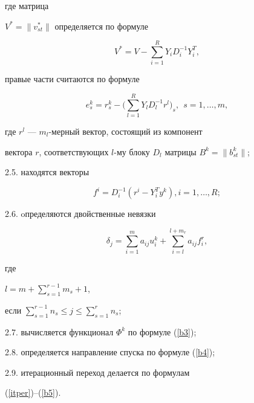 где матрица


$V^* = \|v_{st}^*\|$ определяется по формуле


\begin{equation}\label{b7}


V^* = V - \sum\limits_{i=1}^RY_iD_i^{-1}Y_i^T,


\end{equation}


правые части считаются по формуле


$$


e_s^k = r_s^k - \bigg(\sum\limits_{l=1}^RY_lD_l^{-1}r^l\bigg)_s,


\ \ s=1,\dotsc,m,


$$


где $r^l$ --- $m_l$-мерный вектор, состоящий из компонент


вектора $r$, соответствующих $l$-му блоку $D_l$ матрицы $B^k =


\|b_{st}^k\|$;





2.5. находятся векторы


$$


f^i=D_i^{-1}(r^i-Y_i^Ty^k), i=1,\dotsc,R;


$$





2.6. oпределяются двойственные невязки


$$


\delta_j=\sum\limits_{i=1}^ma_{ij}u_i^k+


\sum\limits_{i=l}^{l+m_r}a_{ij}f^r_i,


$$


где


$l=m+\sum\limits_{s=1}^{r-1}m_s+1$,


если $\sum\limits_{s=1}^{r-1}n_s\leq j\leq


\sum\limits_{s=1}^rn_s$;





2.7. вычисляется функционал $\Phi^k$ по формуле (\ref{b3});





2.8. определяется направление спуска по формуле (\ref{b4});





2.9. итерационный переход делается по формулам


(\ref{itper})--(\ref{b5}).





